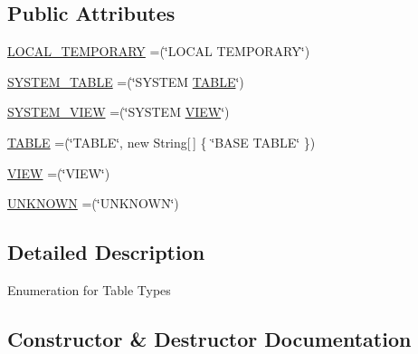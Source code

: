\subsection*{Public Attributes}
\begin{DoxyCompactItemize}
\item 
\mbox{\hyperlink{enumcom_1_1mysql_1_1cj_1_1jdbc_1_1_database_meta_data_1_1_table_type_ae6c597797c0bf59751f836b45127c822}{L\+O\+C\+A\+L\+\_\+\+T\+E\+M\+P\+O\+R\+A\+RY}} =(\char`\"{}L\+O\+C\+AL T\+E\+M\+P\+O\+R\+A\+RY\char`\"{})
\item 
\mbox{\hyperlink{enumcom_1_1mysql_1_1cj_1_1jdbc_1_1_database_meta_data_1_1_table_type_a1f4c2a5aa3f1e1f16e2054ba9a08aa7b}{S\+Y\+S\+T\+E\+M\+\_\+\+T\+A\+B\+LE}} =(\char`\"{}S\+Y\+S\+T\+EM \mbox{\hyperlink{enumcom_1_1mysql_1_1cj_1_1jdbc_1_1_database_meta_data_1_1_table_type_ad2d8ff1f0ba8faf5b6cfa1b89b18a00b}{T\+A\+B\+LE}}\char`\"{})
\item 
\mbox{\hyperlink{enumcom_1_1mysql_1_1cj_1_1jdbc_1_1_database_meta_data_1_1_table_type_a3e21473428f5961bb605bcf2d980d142}{S\+Y\+S\+T\+E\+M\+\_\+\+V\+I\+EW}} =(\char`\"{}S\+Y\+S\+T\+EM \mbox{\hyperlink{enumcom_1_1mysql_1_1cj_1_1jdbc_1_1_database_meta_data_1_1_table_type_a07a3b8c5fd1c16cdd2e28be65aed0f0d}{V\+I\+EW}}\char`\"{})
\item 
\mbox{\hyperlink{enumcom_1_1mysql_1_1cj_1_1jdbc_1_1_database_meta_data_1_1_table_type_ad2d8ff1f0ba8faf5b6cfa1b89b18a00b}{T\+A\+B\+LE}} =(\char`\"{}T\+A\+B\+LE\char`\"{}, new String\mbox{[}$\,$\mbox{]} \{ \char`\"{}B\+A\+SE T\+A\+B\+LE\char`\"{} \})
\item 
\mbox{\hyperlink{enumcom_1_1mysql_1_1cj_1_1jdbc_1_1_database_meta_data_1_1_table_type_a07a3b8c5fd1c16cdd2e28be65aed0f0d}{V\+I\+EW}} =(\char`\"{}V\+I\+EW\char`\"{})
\item 
\mbox{\hyperlink{enumcom_1_1mysql_1_1cj_1_1jdbc_1_1_database_meta_data_1_1_table_type_a2f0137826f74b0ecdd5b99db06912a91}{U\+N\+K\+N\+O\+WN}} =(\char`\"{}U\+N\+K\+N\+O\+WN\char`\"{})
\end{DoxyCompactItemize}


\subsection{Detailed Description}
Enumeration for Table Types 

\subsection{Constructor \& Destructor Documentation}
\mbox{\label{enumcom_1_1mysql_1_1cj_1_1jdbc_1_1_database_meta_data_1_1_table_type_aa8322d99d6c5dfebf2d447a31ef547ff}} 
